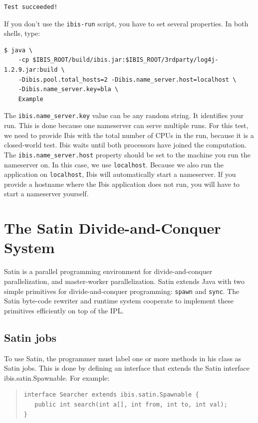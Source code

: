 \documentclass[10pt]{article}
\newcommand{\mysection}[1]{\section{#1}\label{#1}}
\newcommand{\mysubsection}[1]{\subsection{#1}\label{#1}}
\begin{document}
\noindent
{\small
\begin{verbatim}
Test succeeded!
\end{verbatim}
}
\noindent
If you don't use the \texttt{ibis-run} script, you have to set several properties.
In both shells, type:

\noindent
{\small
\begin{verbatim}
$ java \
    -cp $IBIS_ROOT/build/ibis.jar:$IBIS_ROOT/3rdparty/log4j-1.2.9.jar:build \
    -Dibis.pool.total_hosts=2 -Dibis.name_server.host=localhost \
    -Dibis.name_server.key=bla \
    Example
\end{verbatim}
}
\noindent
The \texttt{ibis.name\_server.key} value can be any random string.
It identifies your run.
This is done because one nameserver can serve multiple
runs. For this test, we need to provide Ibis with the total number of
CPUs in the run, because it is a closed-world test. Ibis waits until
both processors have joined the computation.
The \texttt{ibis.name\_server.host} property should
be set to the machine you run the nameserver on.  In this case, we use
\texttt{localhost}.
Because we also run the application on \texttt{localhost}, Ibis will
automatically start a nameserver. If you provide a hostname where the
Ibis application does not run, you will have to start a nameserver
yourself.

\mysection{The Satin Divide-and-Conquer System}

Satin is a parallel programming environment for divide-and-conquer
parallelization, and master-worker parallelization. Satin extends Java
with two simple primitives for divide-and-conquer programming: \texttt{spawn}
and \texttt{sync}. The Satin byte-code rewriter and runtime system cooperate to
implement these primitives efficiently on top of the IPL.  

\mysubsection{Satin jobs}

To use Satin, the programmer must label one or more methods in his
class as Satin jobs. This is done by defining an interface that
extends the Satin interface ibis.satin.Spawnable. For example:

{\small
\begin{quote}
\begin{verbatim}
interface Searcher extends ibis.satin.Spawnable {
   public int search(int a[], int from, int to, int val);
}
\end{verbatim}
\end{quote}
}
\noindent
\end{document}
